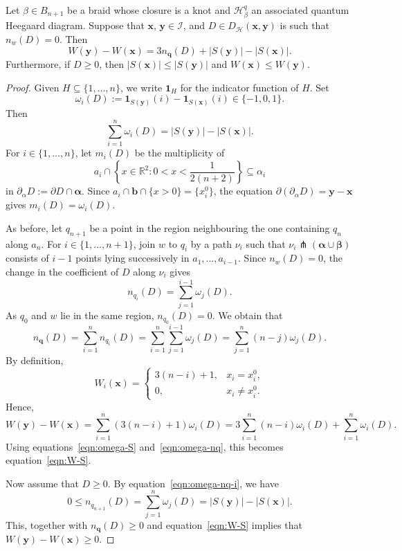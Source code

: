 \documentclass[11pt]{amsart}
\numberwithin{equation}{section}
\numberwithin{figure}{section}
\theoremstyle{definition}
\newcommand{\cH}{\mathcal{H}}
\newcommand{\cI}{\mathcal{I}}
\newcommand{\bR}{\mathbb{R}}
\newcommand{\as}{\boldsymbol{\alpha}}
\newcommand{\bs}{\boldsymbol{\beta}}
\newcommand{\one}{\boldsymbol{1}}
\newcommand{\bb}{\boldsymbol{b}}
\newcommand{\qs}{\boldsymbol{q}}
\newcommand{\xs}{\boldsymbol{x}}
\newcommand{\ys}{\boldsymbol{y}}
\begin{document}
\begin{prop}\label{prop:W-S}
    Let $\beta \in B_{n+1}$ be a braid whose closure is a knot and $\cH^q_\beta$ an associated quantum Heegaard diagram. Suppose that $\xs$, $\ys \in \cI$, and $D \in D_{\cH}(\xs,\ys)$ is such that $n_w(D) = 0$. Then
    \begin{equation}\label{eqn:W-S}
    W(\ys) - W(\xs) = 3n_{\qs}(D) + |S(\ys)| - |S(\xs)|.
    \end{equation}
    Furthermore, if $D \ge 0$, then $|S(\xs)| \le |S(\ys)|$ and $W(\xs) \le W(\ys)$.
\end{prop}

\begin{proof}
    Given $H \subseteq \{1,\dots,n\}$, we write $\one_H$ for the indicator function of $H$. Set
    \[
    \omega_i(D) := \one_{S(\ys)}(i) - \one_{S(\xs)}(i) \in \{-1,0,1\}.
    \]
    Then
    \begin{equation}\label{eqn:omega-S}
    \sum_{i=1}^n \omega_i(D) = |S(\ys)| - |S(\xs)|.
    \end{equation}
    For $i \in \{1,\dots,n\}$, let $m_i(D)$ be the multiplicity of 
    \[
    a_i \cap \left\{x \in \bR^2 : 0 < x < \frac{1}{2(n+2)}\right\} \subseteq \alpha_i
    \]
    in $\partial_\alpha D := \partial D \cap \as$. Since $a_i \cap \bb \cap \{x>0\} = \{x_i^0\}$, the equation $\partial(\partial_\alpha D) = \ys - \xs$ gives $m_i(D) = \omega_i(D)$.

    As before, let $q_{n+1}$ be a point in the region neighbouring the one containing $q_n$ along $a_n$. For $i \in \{1,\dots,n+1\}$, join $w$ to $q_i$ by a path $\nu_i$ such that $\nu_i \pitchfork (\as \cup \bs)$ consists of $i-1$ points lying successively in $a_1,\dots,a_{i-1}$. Since $n_w(D) = 0$, the change in the coefficient of $D$ along $\nu_i$ gives
    \begin{equation}\label{eqn:omega-nq-i}
    n_{q_i}(D) = \sum_{j=1}^{i-1} \omega_j(D).
    \end{equation}
    As $q_0$ and $w$ lie in the same region, $n_{q_0}(D) = 0$. We obtain that
    \begin{equation}\label{eqn:omega-nq}
    n_{\qs}(D) = \sum_{i=1}^n n_{q_i}(D) = \sum_{i=1}^n \sum_{j=1}^{i-1} \omega_j(D) = \sum_{j=1}^n (n-j)\omega_j(D).
    \end{equation}
    By definition,
    \[
    W_i(\xs) = 
    \begin{cases}
        3(n-i)+1, & x_i = x_i^0,\\
        0, & x_i \neq x_i^0.
    \end{cases}
    \]
    Hence,
    \[
    W(\ys) - W(\xs) = \sum_{i=1}^n (3(n-i)+1) \omega_i(D) = 3\sum_{i=1}^n (n-i)\omega_i(D) + \sum_{i=1}^n \omega_i(D).
    \]
    Using equations~\eqref{eqn:omega-S} and~\eqref{eqn:omega-nq}, this becomes equation~\eqref{eqn:W-S}.

    Now assume that $D \ge 0$. By equation~\eqref{eqn:omega-nq-i}, we have 
    \[
    0 \le n_{q_{n+1}}(D) = \sum_{j=1}^n \omega_j(D) = |S(\ys)| - |S(\xs)|. 
    \]
    This, together with $n_{\qs}(D) \ge 0$ and equation~\eqref{eqn:W-S} implies that $W(\ys) - W(\xs) \ge 0$.
\end{proof}
\end{document}
